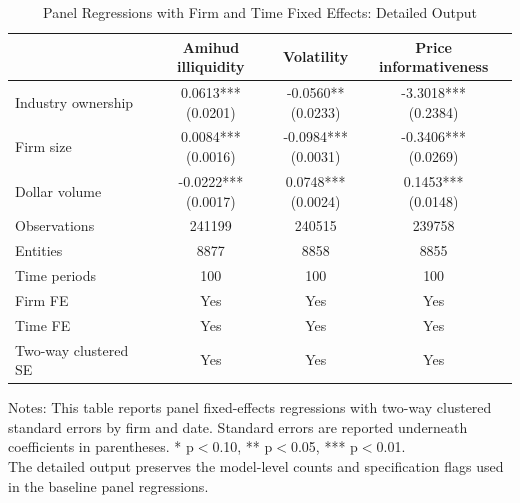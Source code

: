 \begin{table}[!htbp]\centering
\caption{Panel Regressions with Firm and Time Fixed Effects: Detailed Output}
\label{tab:panel_controls_detailed}
\begin{threeparttable}
\footnotesize
\setlength{\tabcolsep}{3.5pt}
\renewcommand{\arraystretch}{1.05}
\begin{tabular}{lccc}
\toprule
 & Amihud illiquidity & Volatility & Price informativeness \\
\midrule
Industry ownership & \shortstack{0.0613***\\(0.0201)} & \shortstack{-0.0560**\\(0.0233)} & \shortstack{-3.3018***\\(0.2384)} \\
Firm size & \shortstack{0.0084***\\(0.0016)} & \shortstack{-0.0984***\\(0.0031)} & \shortstack{-0.3406***\\(0.0269)} \\
Dollar volume & \shortstack{-0.0222***\\(0.0017)} & \shortstack{0.0748***\\(0.0024)} & \shortstack{0.1453***\\(0.0148)} \\
\midrule
Observations & 241199 & 240515 & 239758 \\
Entities & 8877 & 8858 & 8855 \\
Time periods & 100 & 100 & 100 \\
Firm FE & Yes & Yes & Yes \\
Time FE & Yes & Yes & Yes \\
Two-way clustered SE & Yes & Yes & Yes \\
\bottomrule
\end{tabular}
\vspace{0.35em}
\noindent\parbox{\textwidth}{\footnotesize
Notes: This table reports panel fixed-effects regressions with two-way clustered standard errors by firm and date. Standard errors are reported underneath coefficients in parentheses. * p$<$0.10, ** p$<$0.05, *** p$<$0.01.\\
The detailed output preserves the model-level counts and specification flags used in the baseline panel regressions.
}
\end{threeparttable}
\end{table}
